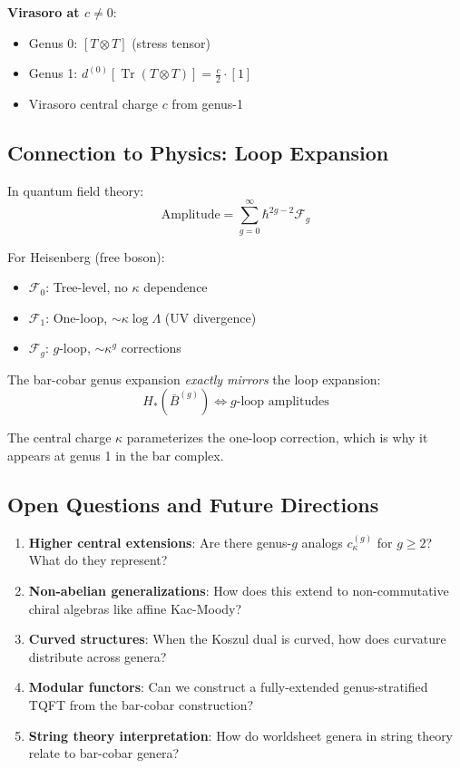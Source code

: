 \textbf{Virasoro at $c \neq 0$}:
\begin{itemize}
\item Genus 0: $[T \otimes T]$ (stress tensor)
\item Genus 1: $d^{(0)}[\operatorname{Tr}(T \otimes T)] = \frac{c}{2} \cdot [1]$
\item Virasoro central charge $c$ from genus-1
\end{itemize}

\subsection{Connection to Physics: Loop Expansion}

In quantum field theory:
\begin{equation}
\text{Amplitude} = \sum_{g=0}^\infty \hbar^{2g-2} \mathcal{F}_g
\end{equation}

For Heisenberg (free boson):
\begin{itemize}
\item $\mathcal{F}_0$: Tree-level, no $\kappa$ dependence
\item $\mathcal{F}_1$: One-loop, $\sim \kappa \log \Lambda$ (UV divergence)
\item $\mathcal{F}_g$: $g$-loop, $\sim \kappa^g$ corrections
\end{itemize}

The bar-cobar genus expansion \emph{exactly mirrors} the loop expansion:
\begin{equation}
H_*(\bar{B}^{(g)}) \Leftrightarrow g\text{-loop amplitudes}
\end{equation}

The central charge $\kappa$ parameterizes the one-loop correction, which is why it appears at genus 1 in the bar complex.

\subsection{Open Questions and Future Directions}

\begin{enumerate}
\item \textbf{Higher central extensions}: Are there genus-$g$ analogs $c_\kappa^{(g)}$ for $g \geq 2$? What do they represent?

\item \textbf{Non-abelian generalizations}: How does this extend to non-commutative chiral algebras like affine Kac-Moody?

\item \textbf{Curved structures}: When the Koszul dual is curved, how does curvature distribute across genera?

\item \textbf{Modular functors}: Can we construct a fully-extended genus-stratified TQFT from the bar-cobar construction?

\item \textbf{String theory interpretation}: How do worldsheet genera in string theory relate to bar-cobar genera?
\end{enumerate}


